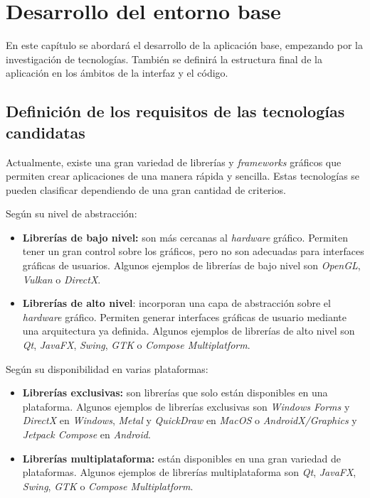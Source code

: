 \chapter{Desarrollo del entorno base}\label{ch:desarrollo-del-entorno-base}

En este capítulo se abordará el desarrollo de la aplicación base, empezando por la investigación
de tecnologías.
También se definirá la estructura final de la aplicación en los ámbitos de la interfaz y el código.


\section{Definición de los requisitos de las tecnologías candidatas}
\label{sec:definicion-requisitos-tecnologías-candidatas}

Actualmente, existe una gran variedad de librerías y \textit{frameworks} gráficos que permiten
crear aplicaciones de una manera rápida y sencilla.
Estas tecnologías se pueden clasificar dependiendo de una gran cantidad de criterios.

\noindent Según su nivel de abstracción:
\begin{itemize}
    \item \textbf{Librerías de bajo nivel:} son más cercanas al \textit{hardware} gráfico.
    Permiten tener un gran control sobre los gráficos, pero no son adecuadas para
    interfaces gráficas de usuarios.
    Algunos ejemplos de librerías de bajo nivel son \textit{OpenGL}, \textit{Vulkan} o \textit{DirectX}.
    \item \textbf{Librerías de alto nivel}: incorporan una capa de abstracción sobre el \textit{hardware} gráfico.
    Permiten generar interfaces gráficas de usuario mediante una arquitectura ya definida.
    Algunos ejemplos de librerías de alto nivel son \textit{Qt}, \textit{JavaFX}, \textit{Swing}, \textit{GTK} o
    \textit{Compose Multiplatform}.
\end{itemize}

\noindent Según su disponibilidad en varias plataformas:
\begin{itemize}
    \item \textbf{Librerías exclusivas:} son librerías que solo están disponibles en una plataforma.
    Algunos ejemplos de librerías exclusivas son \textit{Windows Forms} y \textit{DirectX} en \textit{Windows},
    \textit{Metal} y \textit{QuickDraw} en \textit{MacOS} o \textit{AndroidX/Graphics} y \textit{Jetpack Compose}
    en \textit{Android}.
    \item \textbf{Librerías multiplataforma:} están disponibles en una gran variedad de plataformas.
    Algunos ejemplos de librerías multiplataforma son \textit{Qt}, \textit{JavaFX}, \textit{Swing}, \textit{GTK}
    o \textit{Compose Multiplatform}.
\end{itemize}

